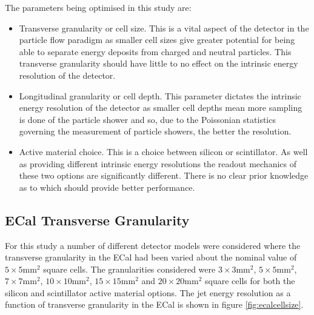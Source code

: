 The parameters being optimised in this study are:
\begin{itemize}
\item Transverse granularity or cell size.  This is a vital aspect of the detector in the particle flow paradigm as smaller cell sizes give greater potential for being able to separate energy deposits from charged and neutral particles.  This transverse granularity should have little to no effect on the intrinsic energy resolution of the detector.  
\item Longitudinal granularity or cell depth.  This parameter dictates the intrinsic energy resolution of the detector as smaller cell depths mean more sampling is done of the particle shower and so, due to the Poissonian statistics governing the measurement of particle showers, the better the resolution.
\item Active material choice.  This is a choice between silicon or scintillator.  As well as providing different intrinsic energy resolutions the readout mechanics of these two options are significantly different.  There is no clear prior knowledge as to which should provide better performance. 
\end{itemize}

\subsection{ECal Transverse Granularity}
\label{sec:ecalcells}
For this study a number of different detector models were considered where the transverse granularity in the ECal had been varied about the nominal value of $5 \times 5 \text{mm}^{2}$ square cells.  The granularities considered were $3 \times 3 \text{mm}^{2}$, $5 \times 5 \text{mm}^{2}$, $7 \times 7 \text{mm}^{2}$, $10 \times 10 \text{mm}^{2}$, $15 \times 15 \text{mm}^{2}$ and $20 \times 20 \text{mm}^{2}$ square cells for both the silicon and scintillator active material options.  The jet energy resolution as a function of transverse granularity in the ECal is shown in figure \ref{fig:ecalcellsize}.

